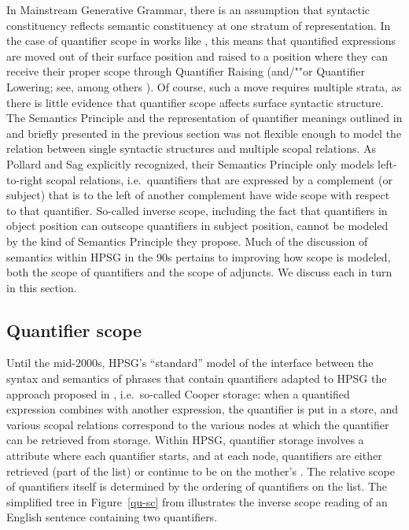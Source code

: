 \documentclass[output=paper
	        ,collection
	        ,collectionchapter
 	        ,biblatex
                ,babelshorthands
                ,newtxmath
                ,draftmode
                ,colorlinks, citecolor=brown
]{langscibook}
\begin{document}
In Mainstream Generative Grammar, there is an assumption that syntactic constituency reflects semantic constituency at one stratum of representation. In the case of quantifier scope in works like \citet{May1985}, this means that quantified expressions are moved out of their surface position and raised to a position where they can receive their proper scope through Quantifier Raising (and/""or Quantifier Lowering; see, among others \citealt{Hornstein1995}). Of course, such a move requires multiple strata, as there is little evidence that quantifier scope affects surface syntactic structure. The Semantics Principle and the representation of quantifier meanings outlined in \citet{PollardandSag1987} and briefly presented in the previous section was not flexible enough to model the relation between single syntactic structures and multiple scopal relations. As Pollard and Sag explicitly recognized, their Semantics Principle only models left-to-right scopal relations, i.e.\ quantifiers that are expressed by a complement (or subject) that is to the left of another complement have wide scope with respect to that quantifier. So-called inverse scope, including the fact that quantifiers in object position can outscope quantifiers in subject position, cannot be modeled by the kind of Semantics Principle they propose. Much of the discussion of semantics within HPSG in the 90s pertains to improving how scope is modeled, both the scope of quantifiers and the scope of adjuncts. We discuss each in turn in this section.


\subsection{Quantifier scope}

Until the mid-2000s, HPSG's ``standard'' model of the interface between the syntax and semantics of phrases that contain quantifiers adapted to HPSG the approach proposed in \citet{Cooper1975,Cooper1983}, i.e.\ so-called Cooper storage: when a quantified expression combines with another expression, the quantifier is put in a store, and various scopal relations correspond to the various nodes at which the quantifier can be retrieved from storage. Within HPSG, quantifier storage involves a  attribute where each quantifier starts, and at each node, quantifiers are either retrieved (part of the  list) or continue to be on the mother's . The relative scope of quantifiers itself is determined by the ordering of quantifiers on the  list. The simplified tree in Figure~\ref{qu-sc} from \citet[324]{PollardandSag1994} illustrates the inverse scope reading of an English sentence containing two quantifiers.
\end{document}
